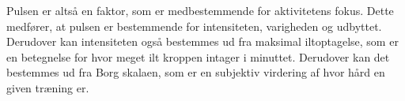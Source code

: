 Pulsen er altså en faktor, som er medbestemmende for aktivitetens fokus. Dette medfører, at pulsen er bestemmende for intensiteten, varigheden og udbyttet. Derudover kan intensiteten også bestemmes ud fra maksimal iltoptagelse, som er en betegnelse for hvor meget ilt kroppen intager i minuttet. Derudover kan det bestemmes ud fra Borg skalaen, som er en subjektiv virdering af hvor hård en given træning er. \citep{Kiens2007}




